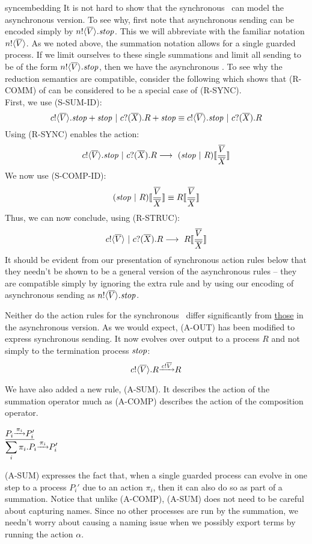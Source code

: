 \begin{example}{syncembedding}
	It is not hard to show that the synchronous \picalc\ can model the asynchronous version.  
To see why, first note that asynchronous sending can be encoded simply by ${n}!\langle{ \ensuremath{\overline{V}} }\rangle.\mbox{\emph{stop}}$.  
This we will abbreviate with the familiar notation ${n}!\langle{ \ensuremath{\overline{V}} }\rangle$.  
As we noted above, the summation notation allows for a single guarded process.  
If we limit ourselves to these single summations and limit all sending to be of the form ${n}!\langle{ \ensuremath{\overline{V}} }\rangle.\mbox{\emph{stop}}$, then we have the asynchronous \picalc.  
To see why the reduction semantics are compatible, consider the following which shows that (R-COMM) of  can be considered to be a special case of (R-SYNC).\\

\noindent First, we use (S-SUM-ID):
\[
	{c}!\langle{ \ensuremath{\overline{V}} }\rangle. \mbox{\emph{stop}} + \mbox{\emph{stop}} \ |\  {c}?({\overline{X}}).R + \mbox{\emph{stop}} \equiv {c}!\langle{ \ensuremath{\overline{V}} }\rangle.\mbox{\emph{stop}} \ |\  {c}?({\overline{X}}).R
\]
Using (R-SYNC) enables the action:
\[
	\ssend{c}{\tuple{V}}\pstop \comp \receive{c}{\tuple{X}}R \pred\  (\pstop \comp R)\subst{\tuple{V}}{\tuple{X}}
\]
We now use (S-COMP-ID):
\[
	(\pstop \comp R)\subst{\tuple{V}}{\tuple{X}}\sequiv R\subst{\tuple{V}}{\tuple{X}}
\]
Thus, we can now conclude, using (R-STRUC):
\[
	\send{c}{\tuple{V}} \comp \receive{c}{\tuple{X}}R \pred\  R \subst{\tuple{V}}{\tuple{X}}
\]
	It should be evident from our presentation of synchronous action rules below that they needn't be shown to be a general version of the asynchronous rules -- they are compatible simply by ignoring the extra rule and by using our encoding of asynchronous sending as ${n}!\langle{ \ensuremath{\overline{V}} }\rangle.\mbox{\emph{stop}}$.
\end{example}

Neither do the action rules for the synchronous \picalc\ differ significantly from \hyperref[apiactionrules]{those} in the asynchronous version.  
As we would expect, (A-OUT) has been modified to express synchronous sending. 
It now evolves over output to a process $R$ and not simply to the termination process $\mbox{\emph{stop}}$:
\[
	{c}!\langle{ \ensuremath{\overline{V}} }\rangle.R \overset{\underrightarrow{\ { \ensuremath{{c}!{\overline{V}}} }\ }}{} R	
\]

We have also added a new rule, (A-SUM). It describes the action of the summation operator much as (A-COMP) describes the action of the composition operator.
\begin{center}
	$\underline{P_i \overset{\underrightarrow{\ {\pi_i}\ }}{} P_i'}$\\
	$\displaystyle\sum_{i}\pi_i.P_i \overset{\underrightarrow{\ {\pi_i}\ }}{} P_i'$\\
\end{center}
(A-SUM) expresses the fact that, when a single guarded process can evolve in one step to a process $P_i'$ due to an action $\pi_i$, then it can also do so as part of a summation.
Notice that unlike (A-COMP), (A-SUM) does not need to be careful about capturing names. 
Since no other processes are run by the summation, we needn't worry about causing a naming issue when we possibly export terms by running the action $\alpha$.

